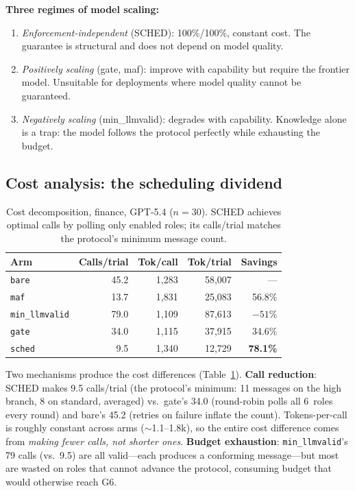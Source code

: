 \textbf{Three regimes of model scaling:}
\begin{enumerate}\itemsep0pt
\item \emph{Enforcement-independent} (SCHED): 100\%/100\%, constant cost.
      The guarantee is structural and does not depend on model quality.
\item \emph{Positively scaling} (gate, maf): improve with capability but
      require the frontier model. Unsuitable for deployments where model
      quality cannot be guaranteed.
\item \emph{Negatively scaling} (min\_llmvalid): degrades with capability.
      Knowledge alone is a trap: the model follows the protocol perfectly
      while exhausting the budget.
\end{enumerate}

\subsection{Cost analysis: the scheduling dividend}\label{sec:cost}

\begin{table}[t]
\centering\small
\caption{Cost decomposition, finance, GPT-5.4 ($n = 30$).
SCHED achieves optimal calls by polling only enabled roles;
its calls/trial matches the protocol's minimum message count.}
\label{tab:cost}
\begin{tabular}{@{}l rrr r@{}}
\toprule
\textbf{Arm} & \textbf{Calls/trial} & \textbf{Tok/call} & \textbf{Tok/trial} & \textbf{Savings} \\
\midrule
\texttt{bare}           & 45.2 & 1{,}283 & 58{,}007 & --- \\
\texttt{maf}            & 13.7 & 1{,}831 & 25{,}083 & 56.8\% \\
\texttt{min\_llmvalid}  & 79.0 & 1{,}109 & 87{,}613 & $-51\%$ \\
\texttt{gate}           & 34.0 & 1{,}115 & 37{,}915 & 34.6\% \\
\texttt{sched}          &  9.5 & 1{,}340 & 12{,}729 & \textbf{78.1\%} \\
\bottomrule
\end{tabular}
\end{table}

Two mechanisms produce the cost differences (Table~\ref{tab:cost}).
\textbf{Call reduction}: SCHED makes 9.5 calls/trial (the protocol's
minimum: 11 messages on the high branch, 8 on standard, averaged) vs.\
gate's 34.0 (round-robin polls all 6~roles every round) and bare's
45.2 (retries on failure inflate the count).
Tokens-per-call is roughly constant across arms (${\sim}$1.1--1.8k),
so the entire cost difference comes from \emph{making fewer calls, not
shorter ones}.
\textbf{Budget exhaustion}: \texttt{min\_llmvalid}'s 79 calls (vs.\ 9.5)
are all valid---each produces a conforming message---but most are wasted
on roles that cannot advance the protocol, consuming budget that would
otherwise reach G6.

